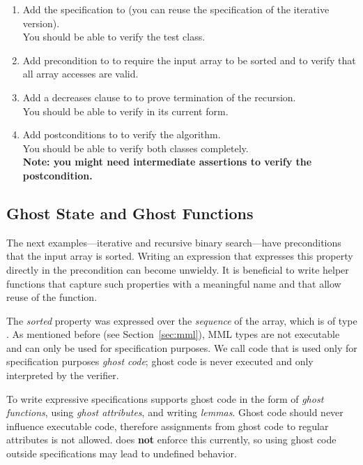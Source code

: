 \begin{enumerate}[label=\bfseries Task \arabic*:, leftmargin=1.8cm]
\item Add the specification to  (you can reuse the specification of the iterative version). \\
      You should be able to verify the test class.
\item Add precondition to  to require the input array to be sorted and to verify that all array accesses are valid.
\item Add a decreases clause to to prove termination of the recursion. \\
      You should be able to verify  in its current form.
\item Add postconditions to  to verify the algorithm. \\
      You should be able to verify both classes completely. \\
      \textbf{Note: you might need intermediate assertions to verify the postcondition.}
\end{enumerate}


\newpage
\subsection{Ghost State and Ghost Functions} \label{sec:ghost}

The next examples---iterative and recursive binary search---have preconditions that the input array is sorted. Writing an expression that expresses this property directly in the precondition can become unwieldy. It is beneficial to write helper functions that capture such properties with a meaningful name and that allow reuse of the function.

The \emph{sorted} property was expressed over the \emph{sequence} of the array, which is of type . As mentioned before (see Section~\ref{sec:mml}), MML types are not executable and can only be used for specification purposes. We call code that is used only for specification purposes \emph{ghost code}; ghost code is never executed and only interpreted by the verifier.

To write expressive specifications \AutoProof supports ghost code in the form of \emph{ghost functions}, using \emph{ghost attributes}, and writing \emph{lemmas}. Ghost code should never influence executable code, therefore assignments from ghost code to regular attributes is not allowed. \AutoProof does \textbf{not} enforce this currently, so using ghost code outside specifications may lead to undefined behavior.

